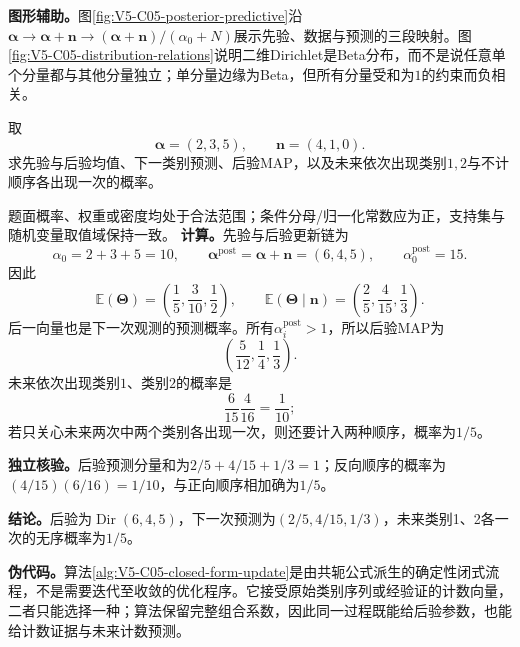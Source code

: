 \label{struct:V5-C05-CH17}
\textbf{图形辅助。}图\ref{fig:V5-C05-posterior-predictive}沿
$\boldsymbol\alpha\to\boldsymbol\alpha+\boldsymbol n\to
(\boldsymbol\alpha+\boldsymbol n)/(\alpha_0+N)$展示先验、数据与预测的三段映射。图\ref{fig:V5-C05-distribution-relations}说明二维Dirichlet是Beta分布，而不是说任意单个分量都与其他分量独立；单分量边缘为Beta，但所有分量受和为$1$的约束而负相关。


\label{struct:V5-C05-CH18}
\begin{example}\label{exm:V5-C05-three-category}
取
\[
\boldsymbol\alpha=(2,3,5),\qquad
\boldsymbol n=(4,1,0).
\]
求先验与后验均值、下一类别预测、后验MAP，以及未来依次出现类别$1,2$与不计顺序各出现一次的概率。
\end{example}

\begin{solution}
\SolGiven 题面概率、权重或密度均处于合法范围；条件分母/归一化常数应为正，支持集与随机变量取值域保持一致。
\SolDerive
\textbf{计算。}先验与后验更新链为
\[
\alpha_0=2+3+5=10,\qquad
\boldsymbol\alpha^{\mathrm{post}}
=\boldsymbol\alpha+\boldsymbol n=(6,4,5),\qquad
\alpha_0^{\mathrm{post}}=15.
\]
因此
\[
\mathbb E(\boldsymbol\Theta)
=\left(\frac15,\frac3{10},\frac12\right),
\qquad
\mathbb E(\boldsymbol\Theta\mid\boldsymbol n)
=\left(\frac25,\frac4{15},\frac13\right).
\]
后一向量也是下一次观测的预测概率。所有$\alpha_i^{\mathrm{post}}>1$，所以后验MAP为
\[
\left(\frac5{12},\frac14,\frac13\right).
\]
未来依次出现类别$1$、类别$2$的概率是
\[
\frac6{15}\frac4{16}=\frac1{10};
\]
若只关心未来两次中两个类别各出现一次，则还要计入两种顺序，概率为$1/5$。

\textbf{独立核验。}后验预测分量和为$2/5+4/15+1/3=1$；反向顺序的概率为$(4/15)(6/16)=1/10$，与正向顺序相加确为$1/5$。

\textbf{结论。}后验为$\operatorname{Dir}(6,4,5)$，下一次预测为$(2/5,4/15,1/3)$，未来类别1、2各一次的无序概率为$1/5$。
\end{solution}


\label{struct:V5-C05-CH19}
\textbf{伪代码。}算法\ref{alg:V5-C05-closed-form-update}是由共轭公式派生的确定性闭式流程，不是需要迭代至收敛的优化程序。它接受原始类别序列或经验证的计数向量，二者只能选择一种；算法保留完整组合系数，因此同一过程既能给后验参数，也能给计数证据与未来计数预测。

